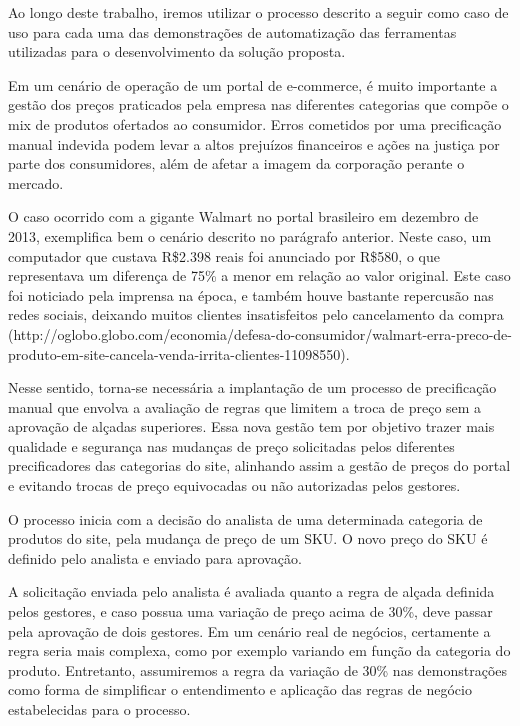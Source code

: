 Ao longo deste trabalho, iremos utilizar o processo descrito a seguir como caso de uso para cada uma das demonstrações de automatização das ferramentas utilizadas para o desenvolvimento da solução proposta.

Em um cenário de operação de um portal de e-commerce, é muito importante a gestão dos preços praticados pela empresa nas diferentes categorias que compõe o mix de produtos ofertados ao consumidor. Erros cometidos por uma precificação manual indevida podem levar a altos prejuízos financeiros e ações na justiça por parte dos consumidores, além de afetar a imagem da corporação perante o mercado. 

O caso ocorrido com a gigante Walmart no portal brasileiro em dezembro de 2013, exemplifica bem o cenário descrito no parágrafo anterior. Neste caso, um computador que custava R\$2.398 reais foi anunciado por R\$580, o que representava um diferença de 75\% a menor em relação ao valor original. Este caso foi noticiado pela imprensa na época, e também houve bastante repercusão nas redes sociais, deixando muitos clientes insatisfeitos pelo cancelamento da compra (http://oglobo.globo.com/economia/defesa-do-consumidor/walmart-erra-preco-de-produto-em-site-cancela-venda-irrita-clientes-11098550). 

Nesse sentido, torna-se necessária a implantação de um processo de precificação manual que envolva a avaliação de regras que limitem a troca de preço sem a aprovação de alçadas superiores. Essa nova gestão tem por objetivo trazer mais qualidade e segurança nas mudanças de preço solicitadas pelos diferentes precificadores das categorias do site, alinhando assim a gestão de preços do portal e evitando trocas de preço equivocadas ou não autorizadas pelos gestores.

O processo inicia com a decisão do analista de uma determinada categoria de produtos do site, pela mudança de preço de um SKU. O novo preço do SKU é definido pelo analista e enviado para aprovação.

A solicitação enviada pelo analista é avaliada quanto a regra de alçada definida pelos gestores, e caso possua uma variação de preço acima de 30\%, deve passar pela aprovação de dois gestores. Em um cenário real de negócios, certamente a regra seria mais complexa, como por exemplo variando em função da categoria do produto. Entretanto, assumiremos a regra da variação de 30\% nas demonstrações como forma de simplificar o entendimento e aplicação das regras de negócio estabelecidas para o processo.

